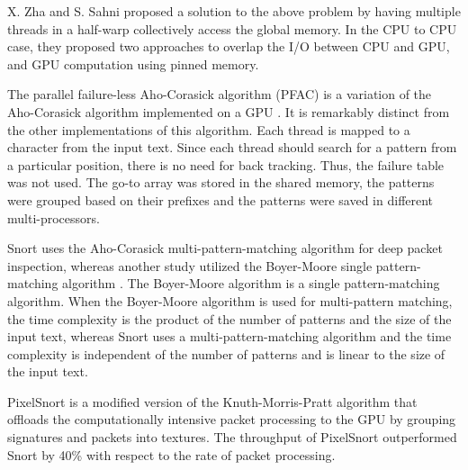X. Zha and S. Sahni \cite{bib12} proposed a solution to the above problem by having multiple threads in a half-warp collectively access the global memory. In the CPU to CPU case, they proposed two approaches to overlap the I/O between CPU and GPU, and GPU computation using pinned memory.

The parallel failure-less Aho-Corasick algorithm (PFAC) is a variation of the Aho-Corasick algorithm implemented on a GPU \cite{bib20}. It is remarkably distinct from the other implementations of this algorithm. Each thread is mapped to a character from the input text. Since each thread should search for a pattern from a particular position, there is no need for back tracking. Thus, the failure table was not used. The go-to array was stored in the shared memory, the patterns were grouped based on their prefixes and the patterns were saved in different multi-processors.

Snort \cite{bib11} uses the Aho-Corasick \cite{bib18} multi-pattern-matching algorithm for deep packet inspection, whereas another study \cite{bib21} utilized the Boyer-Moore single pattern-matching algorithm \cite{bib17}. The Boyer-Moore algorithm is a single pattern-matching algorithm. When the Boyer-Moore algorithm is used for multi-pattern matching, the time complexity is the product of the number of patterns and the size of the input text, whereas Snort uses a multi-pattern-matching algorithm and the time complexity is independent of the number of patterns and is linear to the size of the input text.

PixelSnort \cite{bib22} is a modified version of the Knuth-Morris-Pratt algorithm \cite{bib23} that offloads the computationally intensive packet processing to the GPU by grouping signatures and packets into textures. The throughput of PixelSnort outperformed Snort by 40\% with respect to the rate of packet processing. 